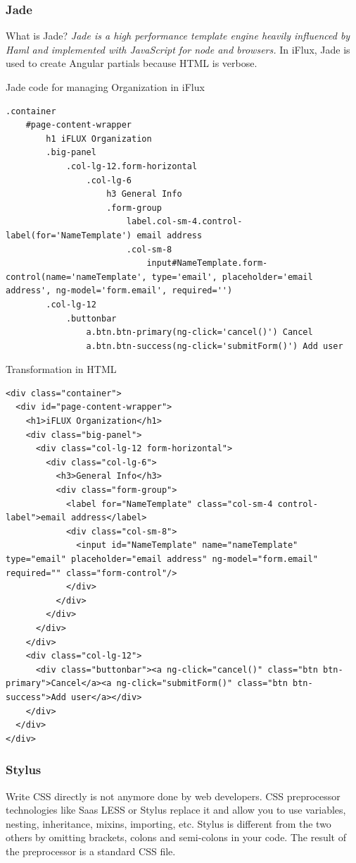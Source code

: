 \subsubsection{Jade}
What is Jade? \emph{Jade is a high performance template engine heavily influenced by Haml and implemented with JavaScript for node and browsers.} In iFlux, Jade is used to create Angular partials because HTML is verbose. 

Jade code for managing Organization in iFlux
\begin{lstlisting}
.container
    #page-content-wrapper
        h1 iFLUX Organization
        .big-panel
            .col-lg-12.form-horizontal
                .col-lg-6
                    h3 General Info
                    .form-group
                        label.col-sm-4.control-label(for='NameTemplate') email address
                        .col-sm-8
                            input#NameTemplate.form-control(name='nameTemplate', type='email', placeholder='email address', ng-model='form.email', required='')
        .col-lg-12
            .buttonbar
                a.btn.btn-primary(ng-click='cancel()') Cancel
                a.btn.btn-success(ng-click='submitForm()') Add user
\end{lstlisting}

Transformation in HTML
\begin{lstlisting}
<div class="container">
  <div id="page-content-wrapper">
    <h1>iFLUX Organization</h1>
    <div class="big-panel">
      <div class="col-lg-12 form-horizontal">
        <div class="col-lg-6">
          <h3>General Info</h3>
          <div class="form-group">
            <label for="NameTemplate" class="col-sm-4 control-label">email address</label>
            <div class="col-sm-8">
              <input id="NameTemplate" name="nameTemplate" type="email" placeholder="email address" ng-model="form.email" required="" class="form-control"/>
            </div>
          </div>
        </div>
      </div>
    </div>
    <div class="col-lg-12">
      <div class="buttonbar"><a ng-click="cancel()" class="btn btn-primary">Cancel</a><a ng-click="submitForm()" class="btn btn-success">Add user</a></div>
    </div>
  </div>
</div>
\end{lstlisting}




\subsubsection{Stylus}

Write CSS directly is not anymore done by web developers. CSS preprocessor technologies like Saas LESS or Stylus replace it and allow you to use variables, nesting, inheritance, mixins, importing, etc. Stylus is different from the two others by omitting brackets, colons and semi-colons in your code. The result of the preprocessor is a standard CSS file.

